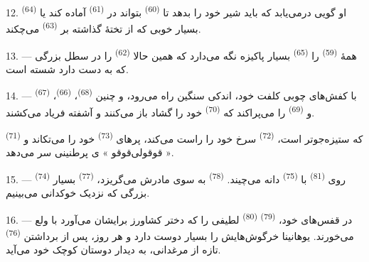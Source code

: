 12. او گویی درمی‌یابد که باید شیر خود را بدهد تا 
\textsuperscript{(60)} بتواند در  \textsuperscript{(61)}
 آماده کند یا  \textsuperscript{(64)} بسیار
خوبی که از تختهٔ گذاشته بر  \textsuperscript{(63)}
می‌چکند.

13. --- همهٔ  \textsuperscript{(59)} را  \textsuperscript{(65)} بسیار پاکیزه نگه می‌دارد که همین حالا
 \textsuperscript{(62)} را در سطل بزرگی که به دست
دارد شسته است.

\VUsaut{3.0mm}
\VUsaut{3.0mm}

14. --- با کفش‌های چوبی کلفت خود، اندکی سنگین راه می‌رود، و چنین
 \textsuperscript{(68)}، 
\textsuperscript{(66)}،  \textsuperscript{(67)} و
 \textsuperscript{(69)} را می‌پراکند که 
\textsuperscript{(70)} خود را گشاد باز می‌کنند و آشفته فریاد می‌کشند.

 \textsuperscript{(71)} که ستیزه‌جوتر است، 
\textsuperscript{(72)} سرخ خود را راست می‌کند، پرهای 
\textsuperscript{(73)} خود را می‌تکاند و « قوقولی‌قوقو » ی پرطنینی سر
می‌دهد.

15. ---  \textsuperscript{(74)} روی 
\textsuperscript{(81)} با  \textsuperscript{(75)} دانه
می‌چیند.  \textsuperscript{(78)} به سوی مادرش
می‌گریزد،  \textsuperscript{(77)} بسیار بزرگی که
نزدیک خوکدانی می‌بینیم.

16. --- در قفس‌های خود،  \textsuperscript{(79)}
 \textsuperscript{(80)} لطیفی را که دختر کشاورز برایشان
می‌آورد با ولع می‌خورند. یوهانینا خرگوش‌هایش را بسیار دوست دارد و هر
روز، پس از برداشتن  \textsuperscript{(76)} تازه از
مرغدانی، به دیدار دوستان کوچک خود می‌آید.

\VUsaut{6.0mm}
\VUfilet{22mm}

